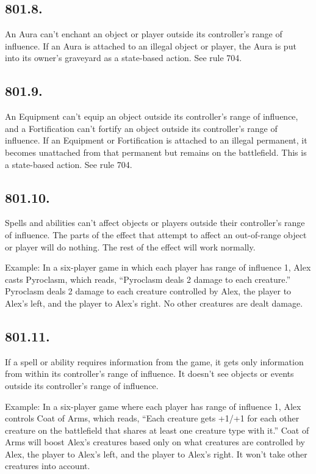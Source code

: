 \subsection*{801.8.}
An Aura can’t enchant an object or player outside its controller’s range of influence. If an Aura is attached to an illegal object or player, the Aura is put into its owner’s graveyard as a state-based action. See rule 704.

\subsection*{801.9.}
An Equipment can’t equip an object outside its controller’s range of influence, and a Fortification can’t fortify an object outside its controller’s range of influence. If an Equipment or Fortification is attached to an illegal permanent, it becomes unattached from that permanent but remains on the battlefield. This is a state-based action. See rule 704.

\subsection*{801.10.}
Spells and abilities can’t affect objects or players outside their controller’s range of influence. The parts of the effect that attempt to affect an out-of-range object or player will do nothing. The rest of the effect will work normally.

Example: In a six-player game in which each player has range of influence 1, Alex casts Pyroclasm, which reads, “Pyroclasm deals 2 damage to each creature.” Pyroclasm deals 2 damage to each creature controlled by Alex, the player to Alex’s left, and the player to Alex’s right. No other creatures are dealt damage.

\subsection*{801.11.}
If a spell or ability requires information from the game, it gets only information from within its controller’s range of influence. It doesn’t see objects or events outside its controller’s range of influence.

Example: In a six-player game where each player has range of influence 1, Alex controls Coat of Arms, which reads, “Each creature gets +1/+1 for each other creature on the battlefield that shares at least one creature type with it.” Coat of Arms will boost Alex’s creatures based only on what creatures are controlled by Alex, the player to Alex’s left, and the player to Alex’s right. It won’t take other creatures into account.

